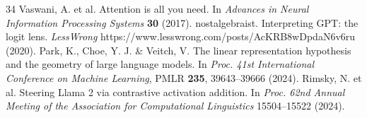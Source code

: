\begin{thebibliography}{34}
 Vaswani, A. et al. Attention is all you need. In \textit{Advances in Neural Information Processing Systems} \textbf{30} (2017).
 nostalgebraist. Interpreting GPT: the logit lens. \textit{LessWrong} https://www.lesswrong.com/posts/AcKRB8wDpdaN6v6ru (2020).
 Park, K., Choe, Y. J. \& Veitch, V. The linear representation hypothesis and the geometry of large language models. In \textit{Proc. 41st International Conference on Machine Learning}, PMLR \textbf{235}, 39643--39666 (2024).
 Rimsky, N. et al. Steering Llama 2 via contrastive activation addition. In \textit{Proc. 62nd Annual Meeting of the Association for Computational Linguistics} 15504--15522 (2024).
\end{thebibliography}
